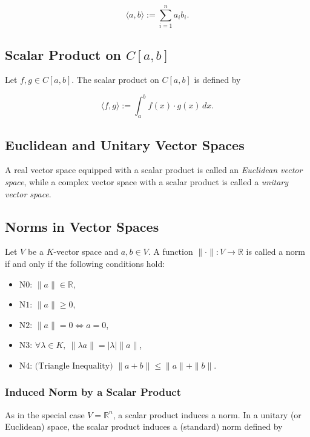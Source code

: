 \[
\langle a, b \rangle := \sum_{i=1}^n a_i b_i.
\]

\subsection{Scalar Product on \( C[a, b] \)}

Let \( f, g \in C[a, b] \). The scalar product on \( C[a, b] \) is defined by

\[
\langle f, g \rangle := \int_a^b f(x) \cdot g(x) \, dx.
\]

\subsection{Euclidean and Unitary Vector Spaces}

A real vector space equipped with a scalar product is called an \textit{Euclidean vector space}, while a complex vector space with a scalar product is called a \textit{unitary vector space}.

\subsection{Norms in Vector Spaces}

Let \( V \) be a \( K \)-vector space and \( a, b \in V \). A function \( \| \cdot \| : V \to \mathbb{R} \) is called a norm if and only if the following conditions hold:

\begin{itemize}[label=\(-\)]
    \item \( \text{N0: } \|a\| \in \mathbb{R} \),
    \item \( \text{N1: } \|a\| \geq 0 \),
    \item \( \text{N2: } \|a\| = 0 \iff a = 0 \),
    \item \( \text{N3: } \forall \lambda \in K, \ \| \lambda a \| = |\lambda| \| a \| \),
    \item \( \text{N4: (Triangle Inequality) } \| a + b \| \leq \| a \| + \| b \| \).
\end{itemize}

\subsubsection{Induced Norm by a Scalar Product}

As in the special case \( V = \mathbb{R}^n \), a scalar product induces a norm.
In a unitary (or Euclidean) space, the scalar product induces a (standard) norm defined by

